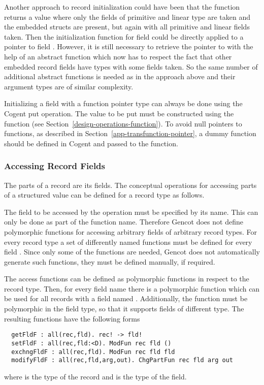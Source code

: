 Another approach to record initialization could have been that the function  returns a value where 
only the fields of primitive and linear type
are taken and the embedded structs are present, but again with all primitive and linear fields taken. Then the initialization function for
field  could be directly applied to a pointer to field . However, it is still necessary to retrieve the pointer to 
with the help of an abstract function which now has to respect the fact that other embedded record fields have types with
some fields taken. So the same number of additional abstract functions is needed as in the approach above and their argument
types are of similar complexity.

Initializing a field  with a function pointer type  can always be done using the Cogent put operation.
The value to be put must be constructed using the function  (see Section~\ref{design-operations-function}). To
avoid null pointers to functions, as described in Section~\ref{app-transfunction-pointer}, a dummy function should be defined in
Cogent and passed to the  function.

\subsubsection{Accessing Record Fields}

The parts of a record are its fields. The conceptual operations for accessing parts of a structured value can be defined for a record type 
 as follows.

The field to be accessed by the operation must be specified by its name. This can only be done as part of the function name.
Therefore Gencot does not define polymorphic functions for accessing arbitrary fields of arbitrary record types. For every record type
 a set of differently named functions must be defined for every field . Since only some of the functions are needed, Gencot
does not automatically generate such functions, they must be defined manually, if required.

The access functions can be defined as polymorphic functions in respect to the record type. Then, for every field name
 there is a polymorphic function which can be used for all records with a field named . Additionally, the
function must be polymorphic in the field type, so that it supports fields of different type. The resulting 
functions have the following forms
\begin{verbatim}
  getFldF : all(rec,fld). rec! -> fld!
  setFldF : all(rec,fld:<D). ModFun rec fld ()
  exchngFldF : all(rec,fld). ModFun rec fld fld
  modifyFldF : all(rec,fld,arg,out). ChgPartFun rec fld arg out
\end{verbatim}
where  is the type of the record and  is the type of the field.

